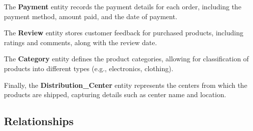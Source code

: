 \documentclass[a4paper,12pt]{article}
\begin{document}
    The \textbf{Payment} entity records the payment details for each order, including the payment method, amount paid, and the date of payment.

    The \textbf{Review} entity stores customer feedback for purchased products, including ratings and comments, along with the review date.

    The \textbf{Category} entity defines the product categories, allowing for classification of products into different types (e.g., electronics, clothing).

    Finally, the \textbf{Distribution\_Center} entity represents the centers from which the products are shipped, capturing details such as center name and location.

    \subsection{Relationships}
\end{document}
